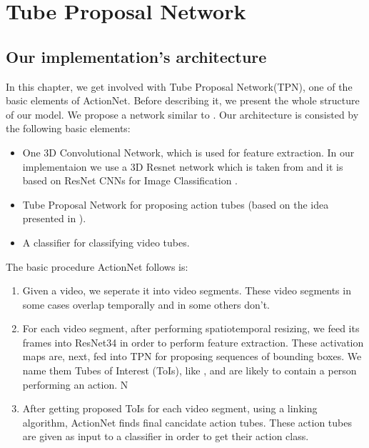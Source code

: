 


% 

\chapter{Tube Proposal Network}

\section{ Our implementation's architecture}
In this chapter, we get involved with Tube Proposal Network(TPN), one of the basic elements of ActionNet. Before describing it, we present
the whole structure of our model. We propose a network similar to \cite{DBLP:journals/corr/HouCS17}.
Our architecture is consisted by the following basic elements:
\begin{itemize}
\item One 3D Convolutional Network, which is used for feature extraction. In our implementaion we use a 3D Resnet network which is taken from
  \cite{hara3dcnns} and it is based on ResNet CNNs for Image Classification \cite{DBLP:journals/corr/HeZRS15}.
\item Tube Proposal Network for proposing action tubes (based on the idea presented in \cite{DBLP:journals/corr/HouCS17}).
\item A classifier for classifying video tubes.
\end{itemize}

The basic procedure ActionNet follows is:
\begin{enumerate}
\item Given a video, we seperate it into video segments. These video segments in some cases overlap temporally and in some others don't.
\item For each video segment, after performing spatiotemporal resizing, we feed its frames into ResNet34 in order to perform feature
  extraction. These activation maps are, next, fed into TPN for proposing sequences of bounding boxes. We name them Tubes of Interest (ToIs), 
  like \cite{DBLP:journals/corr/HouCS17}, and are likely to contain a person performing an action. N
\item After getting proposed ToIs for each video segment, using a linking algorithm, ActionNet finds final cancidate action tubes. These
  action tubes are given as input to a classifier in order to get their action class.
\end{enumerate}


